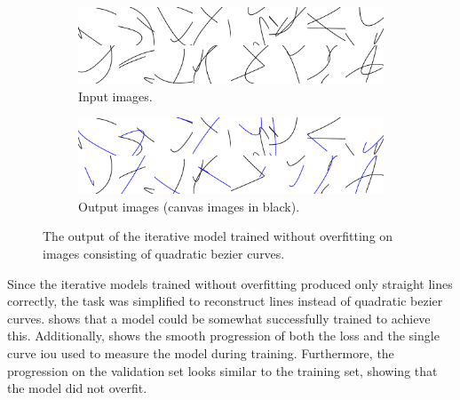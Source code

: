\begin{figure}
    \centering
    \begin{subfigure}{.45\textwidth}
        \includegraphics[width=\textwidth]{graphics/work-artifacts/iterative/120/input.png}
        \caption{Input images.}
    \end{subfigure}
    \begin{subfigure}{.45\textwidth}
        \includegraphics[width=\textwidth]{graphics/work-artifacts/iterative/120/recons.png}
        \caption{Output images (canvas images in black).}
    \end{subfigure}
    \caption{The output of the iterative model trained without overfitting on images consisting of quadratic bezier curves.}
    \label{fig:iterative.120.recons}
\end{figure}

Since the iterative models trained without overfitting produced only straight lines correctly, the task was simplified to reconstruct lines instead of quadratic bezier curves.  shows that a model could be somewhat successfully trained to achieve this. Additionally,  shows the smooth progression of both the loss and the single curve \gls{iou} used to measure the model during training. Furthermore, the progression on the validation set looks similar to the training set, showing that the model did not overfit.

